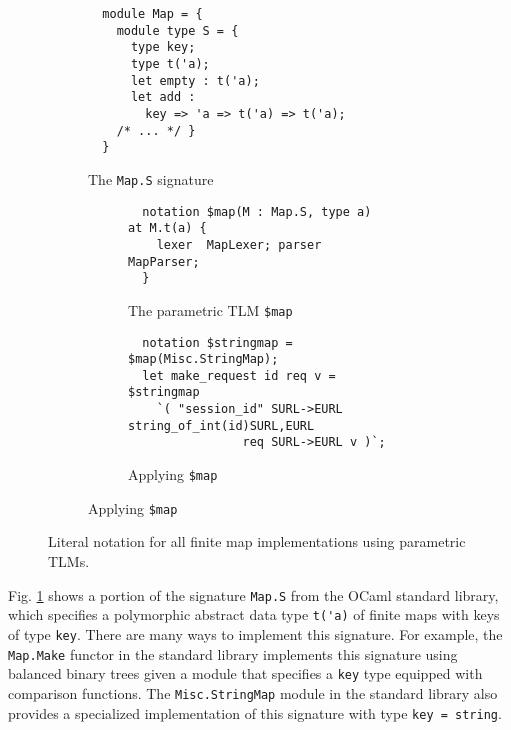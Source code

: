 \documentclass[acmsmall]{acmart}
\newcommand{\li}[1]{\lstinline[basicstyle=\ttfamily\fontsize{9pt}{1em}\selectfont]{#1}}
\begin{document}
\begin{figure}
\begin{subfigure}[t]{0.4\textwidth}
\begin{lstlisting}
  module Map = { 
    module type S = {
      type key;
      type t('a);
      let empty : t('a);
      let add : 
        key => 'a => t('a) => t('a);
    /* ... */ }
  }
\end{lstlisting}
\vspace{-7px}
\caption{The \li{Map.S} signature}
\label{fig:map-sig}
\end{subfigure}
\hfill
\begin{subfigure}[t]{0.55\textwidth}
\begin{subfigure}[t]{\textwidth}
\begin{lstlisting}
  notation $map(M : Map.S, type a) at M.t(a) {
    lexer  MapLexer; parser MapParser; 
  }
\end{lstlisting}
\vspace{-6px}
\caption{The parametric TLM \li{$map}}
\vspace{5px}
\label{fig:map-tlm}
\end{subfigure}
\begin{subfigure}[b]{\textwidth}
\begin{lstlisting}
  notation $stringmap = $map(Misc.StringMap);
  let make_request id req v = $stringmap
    `( "session_id" SURL->EURL string_of_int(id)SURL,EURL
                req SURL->EURL v )`;
\end{lstlisting}
\vspace{-4px}
\caption{Applying \li{$map}}
\label{fig:map-ap}
\end{subfigure}
\end{subfigure}
\vspace{4px}
\caption{Literal notation for all finite map implementations using parametric TLMs.}
\vspace{-5px}
\label{fig:map-fig}
\end{figure}

Fig. \ref{fig:map-sig} shows a portion of the signature \li{Map.S} from the OCaml standard library, which specifies a polymorphic abstract data type \cite{liskov1974programming,harper1997programming} \li{t('a)} of finite maps with keys of type \li{key}. There are many ways to implement this signature. For example, the \li{Map.Make} functor in the standard library implements this signature using balanced binary trees given a module that specifies a \li{key} type equipped with comparison functions. The \li{Misc.StringMap} module in the standard library also provides a specialized implementation of this signature with type \li{key = string}.
\end{document}
